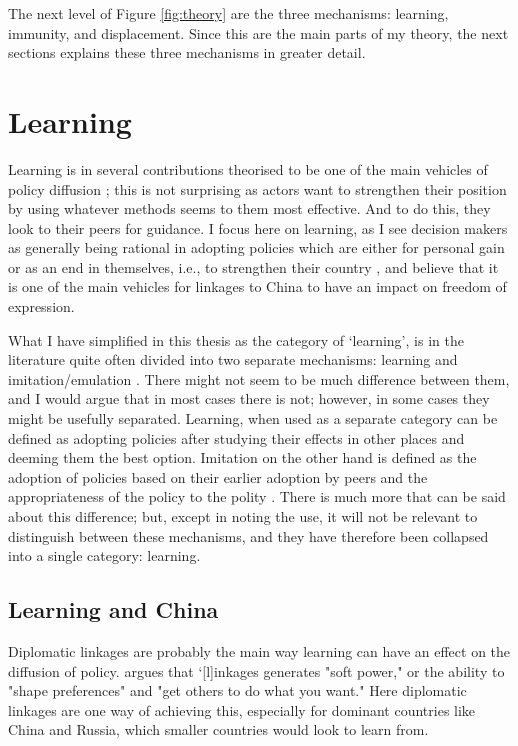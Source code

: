 The next level of Figure \ref{fig:theory} are the three mechanisms: learning, immunity, and displacement. Since this are the main parts of my theory, the next sections explains these three mechanisms in greater detail.

\section{Learning}
Learning is in several contributions theorised to be one of the main vehicles of policy diffusion \citep{gilardi_four_2016, shipan_mechanisms_2008, simmons_introduction_2006}; this is not surprising as actors want to strengthen their position by using whatever methods seems to them most effective. And to do this, they look to their peers for guidance. I focus here on learning, as I see decision makers as generally being rational in adopting policies which are either for personal gain or as an end in themselves, i.e., to strengthen their country \citep{shipan_mechanisms_2008}, and believe that it is one of the main vehicles for linkages to China to have an impact on freedom of expression.

What I have simplified in this thesis as the category of `learning', is in the literature quite often divided into two separate mechanisms: learning and imitation/emulation \citep{ elkins_waves_2005, gilardi_four_2016, shipan_mechanisms_2008}. There might not seem to be much difference between them, and I would argue that in most cases there is not; however, in some cases they might be usefully separated. Learning, when used as a separate category can be defined as adopting policies after studying their effects in other places and deeming them the best option. Imitation on the other hand is defined as the adoption of policies based on their earlier adoption by peers and the appropriateness of the policy to the polity \citep[pp. 799-801]{simmons_introduction_2006}. There is much more that can be said about this difference; but, except in noting the use, it will not be relevant to distinguish between these mechanisms, and they have therefore been collapsed into a single category: learning. 

\subsection{Learning and China}

Diplomatic linkages are probably the main way learning can have an effect on the diffusion of policy. \citet[p. 385]{levitsky_linkage_2006} argues that `[l]inkages generates "soft power," or the ability to "shape preferences" and "get others to do what you want." Here diplomatic linkages are one way of achieving this, especially for dominant countries like China and Russia, which smaller countries would look to learn from.

